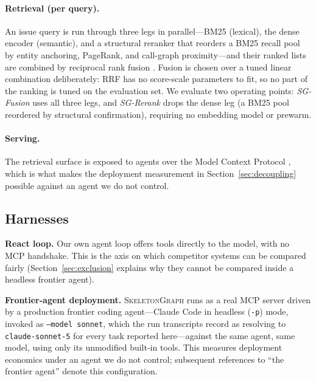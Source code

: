 \documentclass[11pt,letterpaper]{article}
\newcommand{\sg}{\textsc{SkeletonGraph}}
\begin{document}
\paragraph{Retrieval (per query).}
An issue query is run through three legs in parallel---BM25 (lexical), the dense
encoder (semantic), and a structural reranker that reorders a BM25 recall pool by
entity anchoring, PageRank, and call-graph proximity---and their ranked lists are
combined by reciprocal rank fusion \citep{rrf}. Fusion is chosen over a tuned
linear combination deliberately: RRF has no score-scale parameters to fit, so no
part of the ranking is tuned on the evaluation set. We evaluate two operating
points: \emph{SG-Fusion} uses all three legs, and \emph{SG-Rerank} drops the dense
leg (a BM25 pool reordered by structural confirmation), requiring no embedding
model or prewarm.

\paragraph{Serving.}
The retrieval surface is exposed to agents over the Model Context Protocol
\citep{mcp}, which is what makes the deployment measurement in
Section~\ref{sec:decoupling} possible against an agent we do not control.

\subsection{Harnesses}
\textbf{React loop.} Our own agent loop offers tools directly to the model, with
no MCP handshake. This is the axis on which competitor systems can be compared
fairly (Section~\ref{sec:exclusion} explains why they cannot be compared inside
a headless frontier agent).

\textbf{Frontier-agent deployment.} \sg{} runs as a real MCP server driven by a
production frontier coding agent---Claude Code in headless (\texttt{-p}) mode,
invoked as \texttt{--model sonnet}, which the run transcripts record as resolving
to \texttt{claude-sonnet-5} for every task reported here---against the same agent,
same model, using only its unmodified built-in tools. This measures deployment economics under an agent we do not
control; subsequent references to ``the frontier agent'' denote this
configuration.
\end{document}
